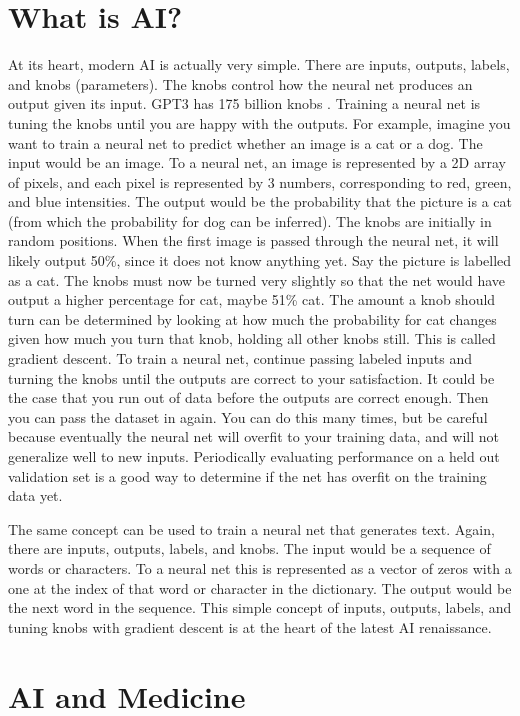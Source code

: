 \section{What is AI?}
At its heart, modern AI is actually very simple.  There are inputs, outputs, labels, and knobs (parameters).  The knobs control how the neural net produces an output given its input.  GPT3 has 175 billion knobs \cite{brown2020language}.  Training a neural net is tuning the knobs until you are happy with the outputs.  For example, imagine you want to train a neural net to predict whether an image is a cat or a dog.  The input would be an image.  To a neural net, an image is represented by a 2D array of pixels, and each pixel is represented by 3 numbers, corresponding to red, green, and blue intensities.  The output would be the probability that the picture is a cat (from which the probability for dog can be inferred).  The knobs are initially in random positions.  When the first image is passed through the neural net, it will likely output 50\%, since it does not know anything yet.  Say the picture is labelled as a cat.  The knobs must now be turned very slightly so that the net would have output a higher percentage for cat, maybe 51\% cat.  The amount a knob should turn can be determined by looking at how much the probability for cat changes given how much you turn that knob, holding all other knobs still.  This is called gradient descent. 
To train a neural net, continue passing labeled inputs and turning the knobs until the outputs are correct to your satisfaction.  It could be the case that you run out of data before the outputs are correct enough.  Then you can pass the dataset in again.  You can do this many times, but be careful because eventually the neural net will overfit to your training data, and will not generalize well to new inputs.  Periodically evaluating performance on a held out validation set is a good way to determine if the net has overfit on the training data yet.

The same concept can be used to train a neural net that generates text.  Again, there are inputs, outputs, labels, and knobs.  The input would be a sequence of words or characters.  To a neural net this is represented as a vector of zeros with a one at the index of that word or character in the dictionary.  The output would be the next word in the sequence.  This simple concept of inputs, outputs, labels, and tuning knobs with gradient descent is at the heart of the latest AI renaissance.

\section{AI and Medicine}

